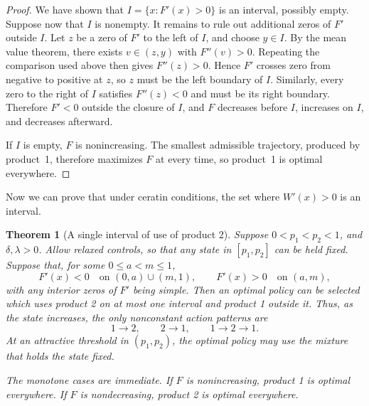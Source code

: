 \documentclass[11pt]{article}
\newtheorem{theorem}{Theorem}
\begin{document}
\begin{proof}
We have shown that $I=\{x:F'(x)>0\}$ is an interval, possibly empty. Suppose now that $I$ is nonempty. It remains to rule out additional zeros of $F'$ outside $I$. Let $z$ be a zero of $F'$ to the left of $I$, and choose $y\in I$. By the mean value theorem, there exists $v\in(z,y)$ with $F''(v)>0$. Repeating the comparison used above then gives $F''(z)>0$. Hence $F'$ crosses zero from negative to positive at $z$, so $z$ must be the left boundary of $I$. Similarly, every zero to the right of $I$ satisfies $F''(z)<0$ and must be its right boundary. Therefore $F'<0$ outside the closure of $I$, and $F$ decreases before $I$, increases on $I$, and decreases afterward.

If $I$ is empty, $F$ is nonincreasing. The smallest admissible trajectory,
produced by product~1, therefore maximizes $F$ at every time, so product~1
is optimal everywhere.
\end{proof}

Now we can prove that under ceratin conditions, the set where $W'(x)>0$ is an interval.

\begin{theorem}[A single interval of use of product 2]
\label{lem:fluid-single-interval}
Suppose $0<p_1<p_2<1$, and $\delta,\lambda>0$.
Allow relaxed controls, so that any state in $[p_1,p_2]$ can be held fixed.
Suppose that, for some $0\leq a<m\leq 1$,
\begin{equation}
       F'(x)<0 \quad \text{on } (0,a)\cup(m,1),
       \qquad
       F'(x)>0 \quad \text{on } (a,m),
\end{equation}
with any interior zeros of $F'$ being simple. Then an optimal policy can be
selected which uses product 2 on at most one interval and product 1 outside it.
Thus, as the state increases, the only nonconstant action patterns are
\begin{equation}
       1\to2,\qquad 2\to1,\qquad 1\to2\to1.
\end{equation}
At an attractive threshold in $(p_1,p_2)$, the optimal policy may use the
mixture that holds the state fixed.

The monotone cases are immediate. If $F$ is nonincreasing, product 1 is optimal
everywhere. If $F$ is nondecreasing, product 2 is optimal everywhere.
\end{theorem}
\end{document}
